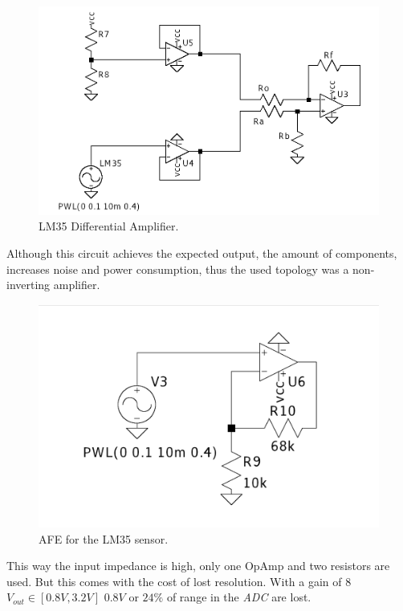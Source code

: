 \documentclass[12pt]{article}
\begin{document}
    \begin{figure}[H] 
        \centering
        \includegraphics*[scale = 0.3]{images/DiffAmpLM35.png}
        \caption{LM35 Differential Amplifier.}
        \label{wrap-fig:1}
    \end{figure}

    Although this circuit achieves the expected output, the amount of components,
    increases noise and power consumption, thus the used topology was a non-inverting amplifier.

    \begin{figure}[H] 
        \centering
        \includegraphics*[scale = 0.2]{images/AFELM35.png}
        \caption{AFE for the LM35 sensor.}
        \label{wrap-fig:1}
    \end{figure}

    This way the input impedance is high, only one OpAmp and two resistors are used.
    But this comes with the cost of lost resolution. With a gain of $8$ $V_{out}\in[0.8V,3.2V]$
    $0.8V$ or $24\%$ of range in the \textit{ADC} are lost.
\end{document}
